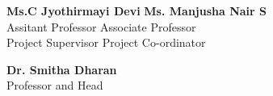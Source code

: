 \documentclass[12pt,a4paper,final]{extreport}
\begin{document}
\vspace{2cm}
\vspace{2cm}
\begin{flushleft}
	\hspace{0.1cm}\textbf{Ms.C Jyothirmayi Devi} \hspace{6.5cm}\textbf{Ms. Manjusha Nair S}\\
	\hspace{0.1cm}Assitant Professor \hspace{7.6cm}Associate Professor\\
	\hspace{0.1cm}Project Supervisor \hspace{7.6cm}Project Co-ordinator
	
\end{flushleft}
\vspace{0.5cm}
\begin{center}
	\textbf{Dr. Smitha Dharan}\\Professor and Head
	
\end{center}

 



\end{document}

